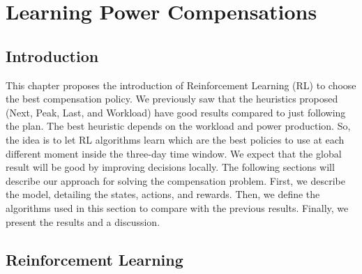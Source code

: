 \chapter{Learning Power Compensations}
\label{cha:learning_power_compensations}

\minitoc

\section{Introduction}

This chapter proposes the introduction of Reinforcement Learning (RL) to choose the best compensation policy. We previously saw that the heuristics proposed (Next, Peak, Last, and Workload) have good results compared to just following the plan. The best heuristic depends on the workload and power production. So, the idea is to let RL algorithms learn which are the best policies to use at each different moment inside the three-day time window. We expect that the global result will be good by improving decisions locally. The following sections will describe our approach for solving the compensation problem. First, we describe the model, detailing the states, actions, and rewards. Then, we define the algorithms used in this section to compare with the previous results. Finally, we present the results and a discussion.

\section{Reinforcement Learning}

